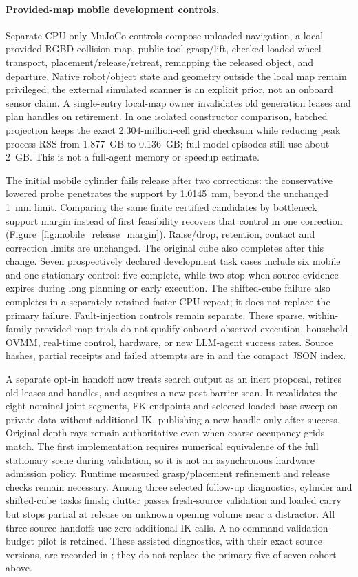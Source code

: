 \paragraph{Provided-map mobile development controls.}
Separate CPU-only MuJoCo controls compose unloaded navigation, a local provided
RGBD collision map, public-tool grasp/lift, checked loaded wheel transport,
placement/release/retreat, remapping the released object, and departure.
Native robot/object state and geometry outside the local map remain privileged;
the external simulated scanner is an explicit prior, not an onboard sensor claim.
A single-entry local-map owner invalidates old generation leases and plan handles
on retirement. In one isolated constructor comparison, batched projection keeps
the exact 2.304-million-cell grid checksum while reducing peak process RSS from
1.877~GB to 0.136~GB; full-model episodes still use about 2~GB. This is not a
full-agent memory or speedup estimate.

The initial mobile cylinder fails release after two corrections: the conservative
lowered probe penetrates the support by 1.0145~mm, beyond the unchanged 1~mm limit.
Comparing the same finite certified candidates by bottleneck support margin
instead of first feasibility recovers that control in one correction
(Figure~\ref{fig:mobile_release_margin}). Raise/drop, retention, contact and
correction limits are unchanged. The original cube also completes after this
change. Seven prospectively declared development task cases include six mobile
and one stationary control: five complete, while two stop when source evidence
expires during long planning or early execution. The shifted-cube failure also
completes in a separately retained faster-CPU repeat; it does not replace the
primary failure. Fault-injection controls remain separate. These sparse,
within-family provided-map trials do not qualify onboard observed execution,
household OVMM, real-time control, hardware, or new LLM-agent success rates.
Source hashes, partial receipts and failed attempts are in
 and the compact JSON index.

A separate opt-in handoff now treats search output as an inert proposal, retires
old leases and handles, and acquires a new post-barrier scan. It revalidates the
eight nominal joint segments, FK endpoints and selected loaded base sweep on
private data without additional IK, publishing a new handle only after success.
Original depth rays remain authoritative even when coarse occupancy grids match.
The first implementation requires numerical equivalence of the full stationary
scene during validation, so it is not an asynchronous hardware admission policy.
Runtime measured grasp/placement refinement and release checks remain necessary.
Among three selected follow-up diagnostics, cylinder and shifted-cube tasks
finish; clutter passes fresh-source validation and loaded carry but stops partial
at release on unknown opening volume near a distractor. All three source handoffs
use zero additional IK calls. A no-command validation-budget pilot is retained.
These assisted diagnostics, with their exact source versions, are recorded in
; they do not replace the
primary five-of-seven cohort above.


